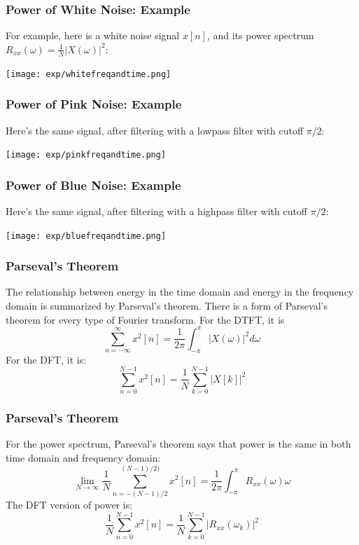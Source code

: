 \documentclass{beamer}
\begin{document}
\begin{frame}
  \frametitle{Power of White Noise: Example}

  For example, here is a white noise signal $x[n]$, and its power
  spectrum $R_{xx}(\omega)=\frac{1}{N}|X(\omega)|^2$:
  \centerline{\texttt{[image: exp/whitefreqandtime.png]}}
\end{frame}

\begin{frame}
  \frametitle{Power of Pink Noise: Example}

  Here's the same signal, after filtering with a lowpass filter with cutoff $\pi/2$:
  \centerline{\texttt{[image: exp/pinkfreqandtime.png]}}
\end{frame}

\begin{frame}
  \frametitle{Power of Blue Noise: Example}

  Here's the same signal, after filtering with a highpass filter with cutoff $\pi/2$:
  \centerline{\texttt{[image: exp/bluefreqandtime.png]}}
\end{frame}

\begin{frame}
  \frametitle{Parseval's Theorem}

  The relationship between energy in the time domain and energy in the
  frequency domain is summarized by Parseval's theorem.  There is a
  form of Parseval's theorem for every type of Fourier transform.  For
  the DTFT, it is
  \begin{displaymath}
    \sum_{n=-\infty}^\infty x^2[n] = \frac{1}{2\pi}\int_{-\pi}^\pi |X(\omega)|^2d\omega
  \end{displaymath}
  For the DFT, it is:
  \begin{displaymath}
    \sum_{n=0}^{N-1} x^2[n] = \frac{1}{N}\sum_{k=0}^{N-1}|X[k]|^2
  \end{displaymath}
\end{frame}

\begin{frame}
  \frametitle{Parseval's Theorem}

  For the power spectrum, Parseval's theorem says that power is the same in
  both time domain and frequency domain:
  \begin{displaymath}
    \lim_{N\rightarrow\infty}\frac{1}{N}\sum_{n=-(N-1)/2}^{(N-1)/2)} x^2[n] =
    \frac{1}{2\pi}\int_{-\pi}^\pi R_{xx}(\omega)\omega
  \end{displaymath}
  The DFT version of power is:
  \begin{displaymath}
    \frac{1}{N}\sum_{n=0}^{N-1} x^2[n] = \frac{1}{N}\sum_{k=0}^{N-1}|R_{xx}(\omega_k)|^2
  \end{displaymath}
\end{frame}
\end{document}
